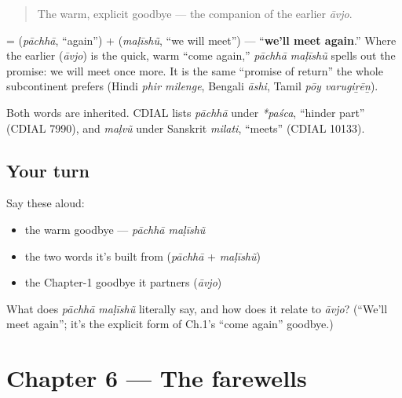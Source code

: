 \begin{quote}
The warm, explicit goodbye — the companion of the earlier \emph{āvjo}.
\end{quote}

\begin{cousinweb}
\textbf{ } = \textbf{} (\emph{pāchhā}, \textquotedblleft{}again\textquotedblright{}) + \textbf{} (\emph{maḷīshũ}, \textquotedblleft{}we will meet\textquotedblright{}) — \textquotedblleft{}\textbf{we'll meet again}.\textquotedblright{} Where the earlier \textbf{} (\emph{āvjo}) is the quick, warm \textquotedblleft{}come again,\textquotedblright{} \emph{pāchhā maḷīshũ} spells out the promise: we will meet once more. It is the same \textquotedblleft{}promise of return\textquotedblright{} the whole subcontinent prefers (Hindi \emph{phir milenge}, Bengali \emph{āshi}, Tamil \emph{pōy varugiṟēṉ}).
\end{cousinweb}

\begin{cousinweb}
Both words are inherited. CDIAL lists \emph{pāchhā} under \emph{*paśca}, \textquotedblleft{}hinder part\textquotedblright{} (CDIAL 7990), and \emph{maḷvũ} under Sanskrit \emph{milati}, \textquotedblleft{}meets\textquotedblright{} (CDIAL 10133).
\end{cousinweb}

\subsection*{Your turn}
Say these aloud:

\begin{itemize}
\raggedright
  \item the warm goodbye — \emph{pāchhā maḷīshũ}
  \item the two words it's built from (\emph{pāchhā} + \emph{maḷīshũ})
  \item the Chapter-1 goodbye it partners (\emph{āvjo})
\end{itemize}

\begin{tcolorbox}[breakable,colback=teal!4,colframe=teal!35!black,title={Before you move on}]
What does \emph{pāchhā maḷīshũ} literally say, and how does it relate to \emph{āvjo}? (\textquotedblleft{}We'll meet again\textquotedblright{}; it's the explicit form of Ch.1's \textquotedblleft{}come again\textquotedblright{} goodbye.)
\end{tcolorbox}
\section[Practice]{Chapter 6 — The farewells}

